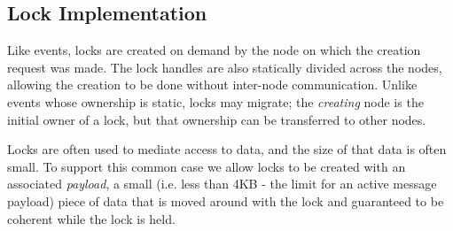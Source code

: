 

\subsection{Lock Implementation}
\label{subsec:lockimpl}

Like events, locks are created on demand by the node on which the creation request was made.  The lock
handles are also statically divided across the nodes, allowing the creation to be done without inter-node
communication.  Unlike events whose ownership is static, locks may migrate; the {\em creating}
node is the initial owner of a lock, but that ownership can be transferred to other nodes.

Locks are often used to mediate access to data, and the size of that data is often small.  To
support this common case we allow locks to be created with an associated
{\em payload}, a small (i.e. less than 4KB - the limit for an active message payload) 
piece of data that is moved around with the lock and guaranteed to be coherent while 
the lock is held.

